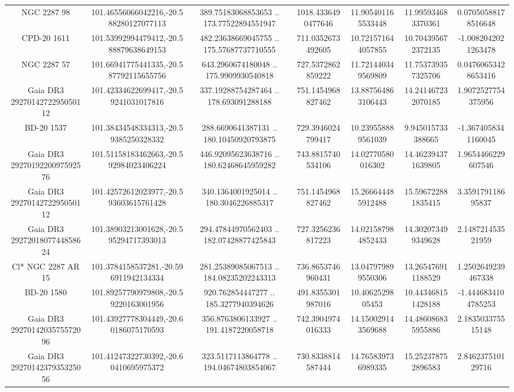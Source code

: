 \begin{table}
\begin{tabular}{ccccccc}
NGC  2287    98 & 101.46556066042216,-20.588280127077113 & 389.75183068853653 .. 173.77522894551947 & 1018.4336490477646 & 11.905401165533448 & 11.995934683370361 & 0.07050588178516648 \\
CPD-20  1611 & 101.53992994479412,-20.588879638649153 & 482.23638669045755 .. 175.57687737710555 & 711.0352673492605 & 10.721571644057855 & 10.704395672372135 & -1.0082042021263478 \\
NGC  2287    57 & 101.66941775441335,-20.587792115655756 & 643.2960674180048 .. 175.9909930540818 & 727.5372862859222 & 11.721440349569809 & 11.753739357325706 & 0.04760653428653416 \\
Gaia DR3 2927014272295050112 & 101.42334622699417,-20.59241031017816 & 337.19288754287464 .. 178.693091288188 & 751.1454968827462 & 13.887564863106443 & 14.241467232070185 & 1.9072527754375956 \\
BD-20  1537 & 101.38434548334313,-20.59385250328332 & 288.6690641387131 .. 180.10450920793875 & 729.3946024799417 & 10.239558889561039 & 9.945015733388665 & -1.3674058341160045 \\
Gaia DR3 2927019220097592576 & 101.51158183462663,-20.592984023406224 & 446.92095623638716 .. 180.62468645959282 & 743.8815740534106 & 14.02770580016302 & 14.462394371639805 & 1.9654466229607546 \\
Gaia DR3 2927014272295050112 & 101.42572612023977,-20.593603615761428 & 340.1364001925014 .. 180.3046226885317 & 751.1454968827462 & 15.266644485912488 & 15.596722881835415 & 3.359179118695837 \\
Gaia DR3 2927201807744858624 & 101.38903213001628,-20.595294717393013 & 294.47844970562403 .. 182.07428877425843 & 727.3256236817223 & 14.021587984852433 & 14.302073499349628 & 2.148721453521959 \\
Cl* NGC 2287     AR      15 & 101.3784158537281,-20.596911942134334 & 281.25389085067513 .. 184.08235202243313 & 736.8653746960431 & 13.047979899550306 & 13.265476911188529 & 1.2502649239467338 \\
BD-20  1580 & 101.89257790979808,-20.59220163001956 & 920.762854447277 .. 185.3277940394626 & 491.8355301987016 & 10.4062529805453 & 10.443468151428188 & -1.4446834104785253 \\
Gaia DR3 2927014203575572096 & 101.43927778304449,-20.60186075170593 & 356.8763806133927 .. 191.4187220058718 & 742.3904974016333 & 14.150029143569688 & 14.486086835955886 & 2.183503375515148 \\
Gaia DR3 2927014237935325056 & 101.41247322730392,-20.60410695975372 & 323.5117113864778 .. 194.04674803854067 & 730.8338814587444 & 14.765839736989335 & 15.252378752896583 & 2.846237510129716 \\

\end{tabular}
\end{table}
